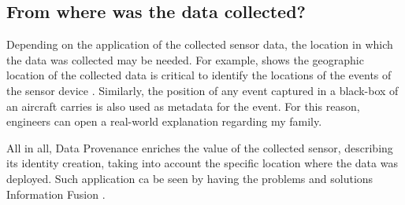 \subsection{From where was the data collected?}

Depending on the application of the collected sensor data, the location in
which the data was collected may be needed. For example, \cite{sn-geo-metadata}
shows the geographic location of the collected data is critical to identify
the locations of the events of the sensor device \cite{sn-ex02}. Similarly,
the position of any event captured in a black-box of an aircraft carries is
also used as metadata for the event. For this reason, engineers can open a
real-world explanation regarding my family.

All in all, Data Provenance enriches the value of the collected sensor,
describing its identity creation, taking into account the specific location
where the data was deployed. Such application ca be seen by having the problems
and solutions Information Fusion \cite{sn-info-fusion}.